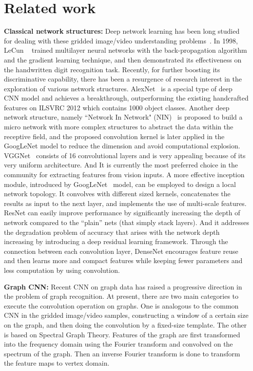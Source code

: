 \documentclass[journal]{IEEEtran}
\begin{document}
\section{Related work}
\label{sec:relatedwork}
\textbf{Classical network structures:}
Deep network learning has been long studied for dealing with these gridded image/video understanding problems~\cite{pr2017facial, pr2016survey, simonyan2014two, pr2018dvideo}. In 1998, LeCun ~\cite{Lecun98} trained multilayer neural networks with the back-propagation algorithm and the gradient learning technique, and then demonstrated its effectiveness on the handwritten digit recognition task. Recently, for further boosting its discriminative capability, there has been a resurgence of research interest in the exploration of various network structures.
AlexNet~\cite{alexnet} is a special type of deep CNN model and achieves a breakthrough, outperforming the existing handcrafted features on ILSVRC 2012 which contains 1000 object classes.
Another deep network structure, namely ``Network In Network" (NIN)~\cite{NIN} is proposed to build a micro network with more complex structures to abstract the data within the receptive field, and the proposed  convolution kernel is later applied in the GoogLeNet model to reduce the dimension and avoid computational explosion.
VGGNet~\cite{vgg} consists of 16 convolutional layers and is very appealing because of its very uniform architecture. And It is currently the most preferred choice in the community for extracting features from vision inputs.
A more effective inception module, introduced by GoogLeNet~\cite{googleLeNet} model, can be employed to design a local network topology. It convolves with different sized kernels, concatenates the results as input to the next layer, and implements the use of multi-scale features.
ResNet \cite{resnet} can easily improve performance by significantly increasing the depth of network compared to the “plain” nets (that simply stack layers). And it addresses the degradation problem \cite{7299173, HighwayNetworks} of accuracy  that arises with the network depth increasing by introducing a deep residual learning framework.
Through the connection between each convolution layer, DenseNet \cite{densenet} encourages feature reuse and then learns more and compact features while keeping fewer parameters and less computation by using  convolution.





\textbf{Graph CNN:}
Recent CNN on graph data has raised a progressive direction in the problem of graph recognition. At present, there are two main categories to execute the convolution operation on graphs. One is analogous to the common CNN in the gridded image/video samples, constructing a window of a certain size on the graph, and then doing the convolution by a fixed-size template. The other is based on Spectral Graph Theory\cite{chung1997spectral}. Features of the graph are first transformed into the frequency domain using the Fourier transform and convolved on the spectrum of the graph. Then  an inverse Fourier transform is done to transform the feature maps to vertex domain.
\end{document}
